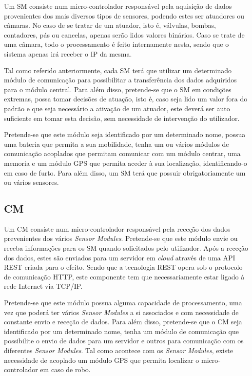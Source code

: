 Um \acl{SM} consiste num micro-controlador responsável pela aquisição de dados provenientes dos mais diversos tipos de sensores, podendo estes ser atuadores ou câmaras. No caso de se tratar de um atuador, isto é, válvulas, bombas, contadores, pás ou cancelas, apenas serão lidos valores binários. Caso se trate de uma câmara, todo o processamento é feito internamente nesta, sendo que o sistema apenas irá receber o IP da mesma. 


Tal como referido anteriormente, cada \acl{SM} terá que utilizar um determinado módulo de comunicação para possibilitar a transferência dos dados adquiridos para o módulo central. Para além disso, pretende-se que o \acl{SM} em condições extremas, possa tomar decisões de atuação, isto é, caso seja lido um valor fora do padrão e que seja necessário a ativação de um atuador, este deverá ser auto suficiente em tomar esta decisão, sem necessidade de intervenção do utilizador. 

Pretende-se que este módulo seja identificado por um determinado nome, possua uma bateria que permita a sua mobilidade, tenha um ou vários módulos de comunicação acoplados que permitam comunicar com um módulo centrar, uma memoria e um módulo \ac{GPS} que permita aceder à sua localização, identificando-o em caso de furto. Para além disso, um \acl{SM} terá que possuir obrigatoriamente um ou vários sensores.








\subsection{\acl{CM}}



Um \acl{CM} consiste num micro-controlador responsável pela receção dos dados prevenientes dos vários \textit{Sensor Modules}. Pretende-se que este módulo envie ou receba informações para os \acl{SM} quando solicitados pelo utilizador. Após a receção dos dados, estes são enviados para um servidor em \textit{cloud} através de uma \ac{API} \ac{REST} criada para o efeito. Sendo que a tecnologia \ac{REST} opera sob o protocolo de comunicação \ac{HTTP}, este componente tem que necessariamente estar ligado à rede Internet via \ac{TCP}/\ac{IP}. 

Pretende-se que este módulo possua alguma capacidade de processamento, uma vez que poderá ter vários \textit{Sensor Modules} a si associados e com necessidade de constante envio e receção de dados.  Para além disso, pretende-se que o \acl{CM} seja identificado por um determinado nome, tenha um  módulo de comunicação que possibilite o envio de dados para um servidor e outros para comunicação com os diferentes \textit{Sensor Modules}. Tal como acontece com os \textit{Sensor Modules}, existe necessidade de acoplado um módulo \ac{GPS} que permita localizar o micro-controlador em caso de robo.
 





